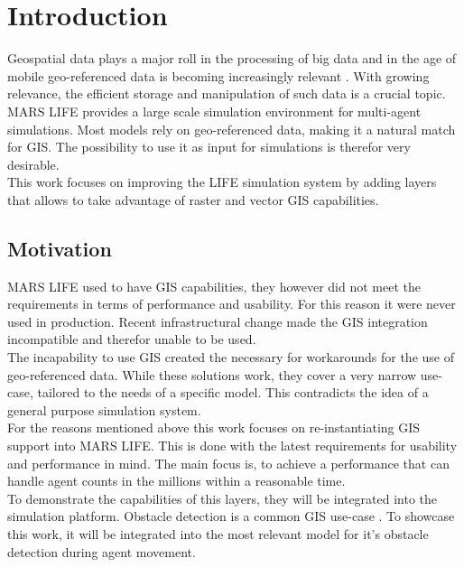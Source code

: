 
\chapter{Introduction}
Geospatial data plays a major roll in the processing of big data and in the age of mobile geo-referenced data is becoming increasingly relevant \citep{Lee2015, Kitchin2013, Graham2013}. With growing relevance, the efficient storage and manipulation of such data is a crucial topic.\\
MARS LIFE provides a large scale simulation environment for multi-agent simulations. Most models rely on geo-referenced data, making it a natural match for GIS. The possibility to use it as input for simulations is therefor very desirable.\\
This work focuses on improving the LIFE simulation system by adding layers that allows to take advantage of raster and vector GIS capabilities.



\section{Motivation}
MARS LIFE used to have GIS capabilities, they however did not meet the requirements in terms of performance and usability. For this reason it were never used in production. Recent infrastructural change made the GIS integration incompatible and therefor unable to be used.\\
The incapability to use GIS created the necessary for workarounds for the use of geo-referenced data. While these solutions work, they cover a very narrow use-case, tailored to the needs of a specific model. This contradicts the idea of a general purpose simulation system.\\
For the reasons mentioned above this work focuses on re-instantiating GIS support into MARS LIFE. This is done with the latest requirements for usability and performance in mind. The main focus is, to achieve a performance that can handle agent counts in the millions within a reasonable time.\\
To demonstrate the capabilities of this layers, they will be integrated into the simulation platform. Obstacle detection is a common GIS use-case \cite{Wang2016}. To showcase this work, it will be integrated into the most relevant model for it's obstacle detection during agent movement.
